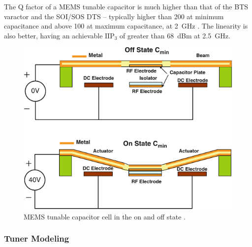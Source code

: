The Q factor of a MEMS tunable capacitor is much higher than that of the BTS varactor and the SOI/SOS DTS -- typically higher than 200 at minimum capacitance and above 100 at maximum capacitance, at \SI{2}{GHz} \cite{gu2014rf}. The linearity is also better, having an achievable $\text{IIP}_3$ of greater than \SI{68}{dBm} at \SI{2.5}{GHz}. 

\begin{figure}[htbp]
    \centering
    \includegraphics{img/analysis/memscap}
    \caption{MEMS tunable capacitor cell in the on and off state \cite{gu2014rf}.}
    \label{fig:memscap}
\end{figure}

\subsubsection{Tuner Modeling}

